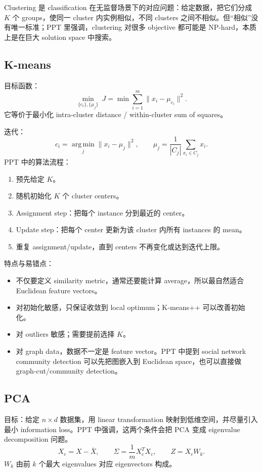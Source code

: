 \documentclass[UTF8,11pt,a4paper]{ctexart}
\newcommand{\argmin}{\operatorname*{arg\,min}}
\begin{document}
Clustering 是 classification 在无监督场景下的对应问题：给定数据，把它们分成 $K$ 个 groups，使同一 cluster 内实例相似，不同 clusters 之间不相似。但“相似”没有唯一标准；PPT 里强调，clustering 对很多 objective 都可能是 NP-hard，本质上是在巨大 solution space 中搜索。

\subsection{K-means}

目标函数：
\[
\min_{\{c_i\},\{\mu_j\}}\ J
=\min\sum_{i=1}^m\|x_i-\mu_{c_i}\|^2.
\]
它等价于最小化 intra-cluster distance / within-cluster sum of squares。

迭代：
\[
c_i=\argmin_j\|x_i-\mu_j\|^2,\qquad
\mu_j=\frac1{|C_j|}\sum_{x_i\in C_j}x_i.
\]
PPT 中的算法流程：
\begin{enumerate}
\item 预先给定 $K$。
\item 随机初始化 $K$ 个 cluster centers。
\item Assignment step：把每个 instance 分到最近的 center。
\item Update step：把每个 center 更新为该 cluster 内所有 instances 的 mean。
\item 重复 assignment/update，直到 centers 不再变化或达到迭代上限。
\end{enumerate}

特点与易错点：
\begin{itemize}
\item 不仅要定义 similarity metric，通常还要能计算 average，所以最自然适合 Euclidean feature vectors。
\item 对初始化敏感，只保证收敛到 local optimum；K-means++ 可以改善初始化。
\item 对 outliers 敏感；需要提前选择 $K$。
\item 对 graph data，数据不一定是 feature vector。PPT 中提到 social network community detection 可以先把图嵌入到 Euclidean space，也可以直接做 graph-cut/community detection。
\end{itemize}

\subsection{PCA}

目标：给定 $n\times d$ 数据集，用 linear transformation 映射到低维空间，并尽量引入最小 information loss。PPT 中强调，这两个条件会把 PCA 变成 eigenvalue decomposition 问题。
\[
X_c=X-\bar X,\qquad
\Sigma=\frac1mX_c^TX_c,\qquad
Z=X_cW_k.
\]
$W_k$ 由前 $k$ 个最大 eigenvalues 对应 eigenvectors 构成。
\end{document}
